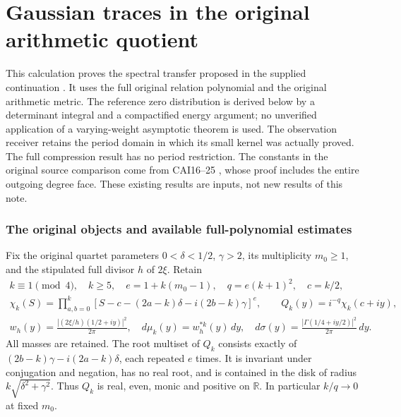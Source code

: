 

\clearpage\begingroup
\part*{Gaussian traces in the original arithmetic quotient}
\newcommand{\garnativeR}{\mathbb R}\newcommand{\garnativeC}{\mathbb C}
\newcommand{\garnativePP}{\mathcal P}\newcommand{\garnativedd}{\,d}
\newcommand{\garnativenorm}[1]{\left\lVert#1\right\rVert}
\newcommand{\garnativeTr}{\operatorname{Tr}}\newcommand{\garnativerank}{\operatorname{rank}}
\newtheorem{garnativetheorem}{Theorem}\newtheorem{garnativelemma}[garnativetheorem]{Lemma}


This calculation proves the spectral transfer proposed in the supplied
continuation \cite{garnative:incoming}. It uses the full original relation polynomial
and the original arithmetic metric. The reference zero distribution is
derived below by a determinant integral and a compactified energy argument;
no unverified application of a varying-weight asymptotic theorem is used.
The observation receiver retains the period domain in which its small
kernel was actually proved. The full compression result has no period
restriction. The constants in the original source comparison come from
CAI16--25 \cite{garnative:cumulative}, whose proof includes the entire outgoing degree
face. These existing results are inputs, not new results of this note.

\section{The original objects and available full-polynomial estimates}
Fix the original quartet parameters $0<\delta<1/2$, $\gamma>2$, its
multiplicity $m_0\ge1$, and the stipulated full divisor $h$ of $2\xi$.
Retain
\begin{equation}\tag{NG1}
 \begin{gathered}
 k\equiv1\pmod4,\quad k\ge5,\quad e=1+k(m_0-1),\quad q=e(k+1)^2,\quad c=k/2,\\
 \chi_k(S)=\prod_{a,b=0}^k
 [S-c-(2a-k)\delta-i(2b-k)\gamma]^e,\qquad
 Q_k(y)=i^{-q}\chi_k(c+iy),\\
 w_h(y)=\frac{|(2\xi/h)(1/2+iy)|^2}{2\pi},\quad
 d\mu_k(y)=w_h^{*k}(y)\garnativedd y,\quad
 d\sigma(y)=\frac{|\Gamma(1/4+iy/2)|^2}{2\pi}\garnativedd y.
 \end{gathered}
\end{equation}
All masses are retained. The root multiset of $Q_k$ consists exactly of
$(2b-k)\gamma-i(2a-k)\delta$, each repeated $e$ times. It is invariant
under conjugation and negation, has no real root, and is contained in the
disk of radius $k\sqrt{\delta^2+\gamma^2}$. Thus $Q_k$ is real, even,
monic and positive on $\garnativeR$. In particular $k/q\to0$ at fixed $m_0$.

